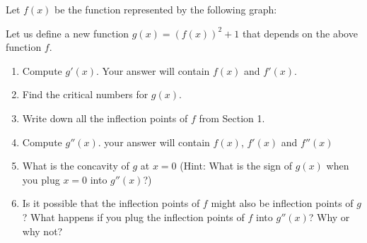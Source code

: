 \documentclass[10pt]{article}
\begin{document}
Let $f(x)$ be the function represented by the following graph:\\
        


Let us define a new function $g(x) = (f(x))^2 + 1$ that depends on the above function $f$.
\begin{enumerate}
    \item Compute $g'(x)$. Your answer will contain $f(x)$ and $f'(x)$.
    \item Find the critical numbers for $g(x)$. 
        \item Write down  all the inflection points of $f$ from Section 1.
    \item Compute $g''(x)$. your answer will contain $f(x)$, $f'(x)$ and $f''(x)$ 
    \item What is the concavity of $g$ at $x = 0$ (Hint: What is the sign of $g(x)$ when you plug $x = 0$ into $g''(x)$?)
    \item Is it possible that  the inflection points of $f$ might also be inflection points of $g$?  What happens if you plug the inflection points of $f$ into $g''(x)$? Why or why not?
\end{enumerate}
\end{document}
